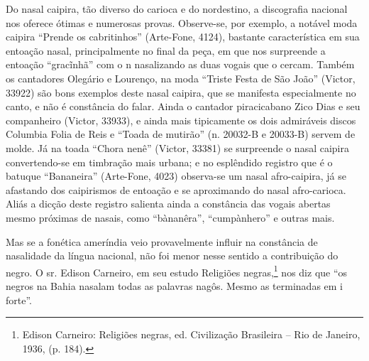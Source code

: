 Do nasal caipira, tão diverso do carioca e do nordestino, a discografia
nacional nos oferece ótimas e numerosas provas. Observe-se, por exemplo,
a notável moda caipira ``Prende os cabritinhos'' (Arte-Fone, 4124),
bastante característica em sua entoação nasal, principalmente no final
da peça, em que nos surpreende a entoação ``gracĩnhã'' com o n
nasalizando as duas vogais que o cercam. Também os cantadores Olegário e
Lourenço, na moda ``Triste Festa de São João'' (Victor, 33922) são bons
exemplos deste nasal caipira, que se manifesta especialmente no canto, e
não é constância do falar. Ainda o cantador piracicabano Zico Dias e seu
companheiro (Victor, 33933), e ainda mais tipicamente os dois admiráveis
discos Columbia Folia de Reis e ``Toada de mutirão'' (n. 20032-B e
20033-B) servem de molde. Já na toada ``Chora nenê'' (Victor, 33381) se
surpreende o nasal caipira convertendo-se em timbração mais urbana; e no
esplêndido registro que é o batuque ``Bananeira'' (Arte-Fone, 4023)
observa-se um nasal afro-caipira, já se afastando dos caipirismos de
entoação e se aproximando do nasal afro-carioca. Aliás a dicção deste
registro salienta ainda a constância das vogais abertas mesmo próximas
de nasais, como ``bànanêra'', ``cumpànhero'' e outras mais.

Mas se a fonética ameríndia veio provavelmente influir na constância de
nasalidade da língua nacional, não foi menor nesse sentido a
contribuição do negro. O sr. Edison Carneiro, em seu estudo Religiões
negras,\footnote{Edison Carneiro: Religiões negras, ed. Civilização Brasileira -- Rio
de Janeiro, 1936, (p. 184).} nos diz que ``os negros na Bahia nasalam todas as palavras
nagôs. Mesmo as terminadas em i forte''.

